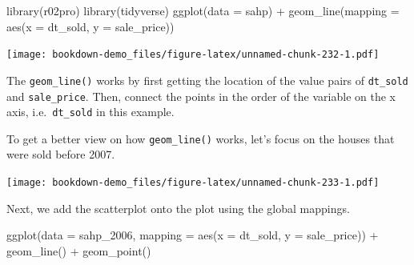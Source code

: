\documentclass[
]{book}
\newenvironment{Shaded}{\begin{snugshade}}{\end{snugshade}}
\newcommand{\AttributeTok}[1]{\textcolor[rgb]{0.77,0.63,0.00}{#1}}
\newcommand{\CommentTok}[1]{\textcolor[rgb]{0.56,0.35,0.01}{\textit{#1}}}
\newcommand{\DecValTok}[1]{\textcolor[rgb]{0.00,0.00,0.81}{#1}}
\newcommand{\FunctionTok}[1]{\textcolor[rgb]{0.00,0.00,0.00}{#1}}
\newcommand{\NormalTok}[1]{#1}
\newcommand{\OtherTok}[1]{\textcolor[rgb]{0.56,0.35,0.01}{#1}}
\newcommand{\SpecialCharTok}[1]{\textcolor[rgb]{0.00,0.00,0.00}{#1}}
\newcommand{\StringTok}[1]{\textcolor[rgb]{0.31,0.60,0.02}{#1}}
\begin{document}
\begin{Shaded}
\begin{Highlighting}[]
\FunctionTok{library}\NormalTok{(r02pro)}
\FunctionTok{library}\NormalTok{(tidyverse)}
\FunctionTok{ggplot}\NormalTok{(}\AttributeTok{data =}\NormalTok{ sahp) }\SpecialCharTok{+} \FunctionTok{geom\_line}\NormalTok{(}\AttributeTok{mapping =} \FunctionTok{aes}\NormalTok{(}\AttributeTok{x =}\NormalTok{ dt\_sold, }\AttributeTok{y =}\NormalTok{ sale\_price))}
\end{Highlighting}
\end{Shaded}

\texttt{[image: bookdown-demo\_files/figure-latex/unnamed-chunk-232-1.pdf]}

The \texttt{geom\_line()} works by first getting the location of the value pairs of \texttt{dt\_sold} and \texttt{sale\_price}. Then, connect the points in the order of the variable on the x axis, i.e.~\texttt{dt\_sold} in this example.

To get a better view on how \texttt{geom\_line()} works, let's focus on the houses that were sold before 2007.

\begin{Shaded}
\end{Shaded}

\texttt{[image: bookdown-demo\_files/figure-latex/unnamed-chunk-233-1.pdf]}

Next, we add the scatterplot onto the plot using the global mappings.

\begin{Shaded}
\begin{Highlighting}[]
\FunctionTok{ggplot}\NormalTok{(}\AttributeTok{data =}\NormalTok{ sahp\_2006, }\AttributeTok{mapping =} \FunctionTok{aes}\NormalTok{(}\AttributeTok{x =}\NormalTok{ dt\_sold, }\AttributeTok{y =}\NormalTok{ sale\_price)) }\SpecialCharTok{+} \FunctionTok{geom\_line}\NormalTok{() }\SpecialCharTok{+} \FunctionTok{geom\_point}\NormalTok{()}
\end{Highlighting}
\end{Shaded}
\end{document}

